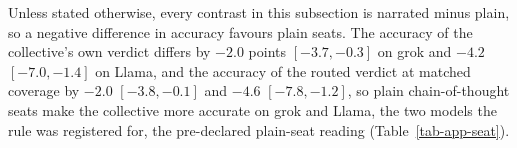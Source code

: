 Unless stated otherwise, every contrast in this subsection is narrated minus
plain, so a negative difference in accuracy favours plain seats. The
accuracy of the collective's own verdict differs by $-2.0$ points
$[-3.7, -0.3]$ on grok and $-4.2$ $[-7.0, -1.4]$ on Llama, and the accuracy
of the routed verdict at matched coverage by $-2.0$ $[-3.8, -0.1]$ and
$-4.6$ $[-7.8, -1.2]$, so plain chain-of-thought seats make the collective
more accurate on grok and Llama, the two models the rule was registered for,
the pre-declared plain-seat reading (Table~\ref{tab-app-seat}).

